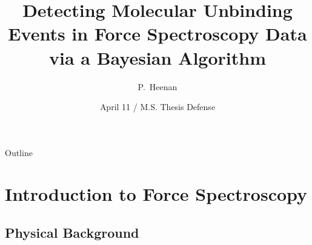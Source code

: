 \documentclass[usenames,dvipsnames]{beamer}
\title[] %
{Detecting Molecular Unbinding Events in Force Spectroscopy Data via a Bayesian Algorithm}
\subtitle
{} %
\author[] %
{P.~Heenan\inst{1}}
\institute[University of Colorado at Boulder] %
{
  \inst{1}%
  Department of Computer Science\\
  University of Colorado at Boulder
}
\date[M.S. Thesis Defense] %
{April 11 / M.S. Thesis Defense}
\begin{document}
\begin{frame}
  \titlepage
\end{frame}

\begin{frame}{Outline}
  \tableofcontents[pausesections]
\end{frame}




\section{Introduction to Force Spectroscopy}

\subsection[Physical Background]{Physical Background}
\end{document}
